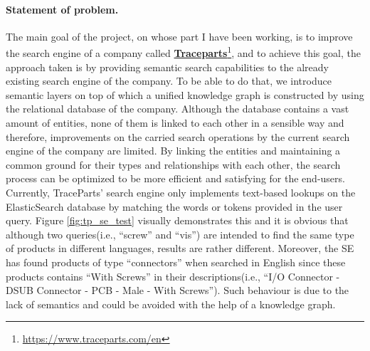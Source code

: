 \paragraph{Statement of problem.}
The main goal of the project, on whose part I have been working, is to improve the search engine 
of a company called \href{https://www.traceparts.com/en}{\textbf{Traceparts}}\footnote{
\url{https://www.traceparts.com/en}}, and to achieve this goal, the approach taken is by 
providing semantic search capabilities to the already existing search engine of the company. 
To be able to do that, we introduce semantic layers on top of which a unified knowledge graph is 
constructed by using the relational database of the company. Although the database contains a vast 
amount of entities, none of them is linked to each other in a sensible way and therefore, 
improvements on the carried search operations by the current search engine of the company are 
limited. By linking the entities and maintaining a common ground for their types and relationships 
with each other, the search process can be optimized to be more efficient and satisfying for the 
end-users. Currently, TraceParts' search engine only implements text-based lookups on the 
ElasticSearch database by matching the words or tokens provided in the user query. Figure 
\ref{fig:tp_se_test} visually demonstrates this and it is obvious that although two queries(i.e., 
``screw'' and ``vis'') are intended to find the same type of products in different languages, 
results are rather different. Moreover, the SE has found products of type ``connectors'' when 
searched in English since these products contains ``With Screws'' in their descriptions(i.e., 
``I/O Connector - DSUB Connector - PCB - Male - With Screws''). Such behaviour is due to the lack of 
semantics and could be avoided with the help of a knowledge graph.

